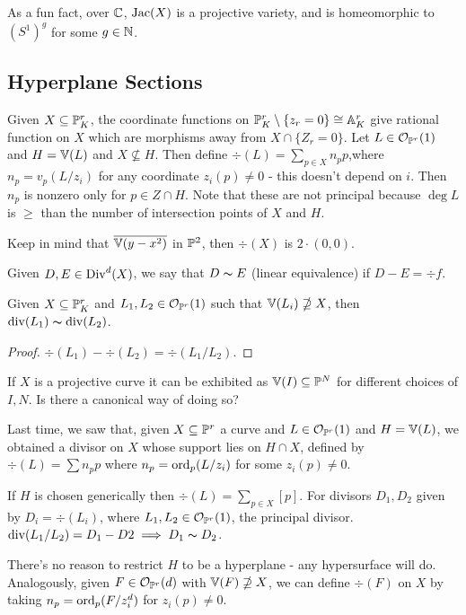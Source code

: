 \documentclass[10pt,a4paper,rgb]{article}
\newcommand{\A}{\mathbb{A}}
\begin{document}
As a fun fact, over $\C$, $\Jac(X)$ is a projective variety, and is homeomorphic to $(S^1)^g$ for some $g \in \N$.

\subsection{Hyperplane Sections}
Given $X \subseteq \P_K^r$, the coordinate functions on $\P_K^r \setminus \{z_r = 0\}\cong \A^r_K$ give rational function on $X$ which are morphisms away from $X \cap \{Z_r = 0\}$. Let $L \in \mathcal{O}_{\P^r}(1)$ and $H = \V(L)$ and $X \nsubseteq H$. Then define $\div(L) = \sum_{p\in X}n_p p$,where $n_p = v_p(L/z_i)$ for any coordinate $z_i(p) \neq 0$ - this doesn't depend on $i$. Then $n_p$ is nonzero only for $p \in Z \cap H$. Note that these are not principal because $\deg L$ is $\geq$ than the number of intersection points of $X$ and $H$.

Keep in mind that $\overline{\V(y-x^2)}$ in $\P^2$, then $\div(X)$ is $2\cdot(0,0)$.

Given $D, E \in \Div^d(X)$, we say that $D \thicksim E$ (linear equivalence) if $D-E = \div f$. 

\begin{proposition}
Given $X \subseteq \P_K^r$ and $L_1, L_2 \in \mathcal{O}_{\P^r}(1)$ such that $\V(L_i) \nsupseteq X$, then $\div(L_1) \thicksim \div(L_2)$.
\end{proposition}
\begin{proof}
$\div(L_1) - \div(L_2) = \div(L_1/L_2)$.
\end{proof}

If $X$ is a projective curve it can be exhibited as $\V(I) \subseteq \P^N$ for different choices of $I, N$. Is there a canonical way of doing so?

Last time, we saw that, given $X \subseteq \P^r$ a curve and $L \in \mathcal{O}_{\P^r}(1)$ and $H = \V(L)$, we obtained a divisor on $X$ whose support lies on $H \cap X$, defined by $\div(L) = \sum n_p p$ where $n_p = \ord_p(L/z_i)$ for some $z_i(p) \neq 0$.

If $H$ is chosen generically then $\div(L) = \sum_{p\in X} [p]$. For divisors $D_1, D_2$ given by $D_i = \div(L_i)$, where $L_1, L_2 \in \mathcal{O}_{\P^r}(1)$, the principal divisor. $\div(L_1/L_2) = D_1-D2 \implies D_1 \thicksim D_2$.

There's no reason to restrict $H$ to be a hyperplane - any hypersurface will do. Analogously, given $F \in \mathcal{O}_{\P^r}(d)$ with $\V(F) \nsupseteq X$, we can define $\div(F)$ on $X$ by taking $n_p = \ord_p(F/z_i^d)$ for $z_i(p) \neq 0$.
\end{document}
